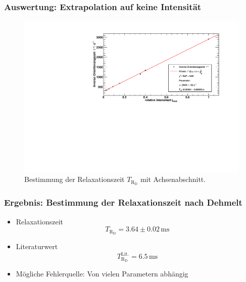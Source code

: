 \begin{frame}
\frametitle{Auswertung: Extrapolation auf keine Intensität}
\begin{figure}
    \begin{center}
        \includegraphics[width=\textwidth]{../img/taufit.pdf}
        \caption{Bestimmung der Relaxationszeit $T_{\text{R}_\text{D}}$ mit Achsenabschnitt.}
    \end{center}
\end{figure}
\end{frame}

\begin{frame}
\frametitle{Ergebnis: Bestimmung der Relaxationszeit nach Dehmelt}
\begin{itemize}[<+->]
    \item Relaxationszeit
    \begin{equation*}
        T_{\text{R}_\text{D}} = 3.64 \pm 0.02\,\text{ms}
    \end{equation*}
    \item Literaturwert
    \begin{equation*}
        T_{\text{R}_\text{D}}^\text{Lit.} = 6.5\,\text{ms}
    \end{equation*}
    \item Mögliche Fehlerquelle: Von vielen Parametern abhängig
\end{itemize}
\end{frame}